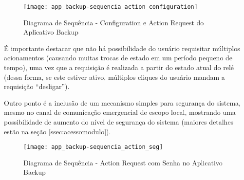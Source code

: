 \begin{figure}[H]
	\centering
	\caption{Diagrama de Sequência - Configuration e Action Request do Aplicativo Backup}
	\texttt{[image: app\_backup-sequencia\_action\_configuration]}
	\label{fig:app_backup-sequencia_action_configuration}
\end{figure}

É importante destacar que não há possibilidade do usuário requisitar múltiplos acionamentos (causando muitas trocas de estado em um período pequeno de tempo), uma vez que a requisição é realizada a partir do estado atual do relé (dessa forma, se este estiver ativo, múltiplos cliques do usuário mandam a requisição ``desligar'').

Outro ponto é a inclusão de um mecanismo simples para segurança do sistema, mesmo no canal de comunicação emergencial de escopo local, mostrando uma possibilidade de aumento do nível de segurança do sistema (maiores detalhes estão na seção \ref{ssec:acessomodulo}).

\begin{figure}[H]
	\centering
	\caption{Diagrama de Sequência - Action Request com Senha no Aplicativo Backup}
	\texttt{[image: app\_backup-sequencia\_action\_seg]}
	\label{fig:app_backup-sequencia_action_seg}
\end{figure}
